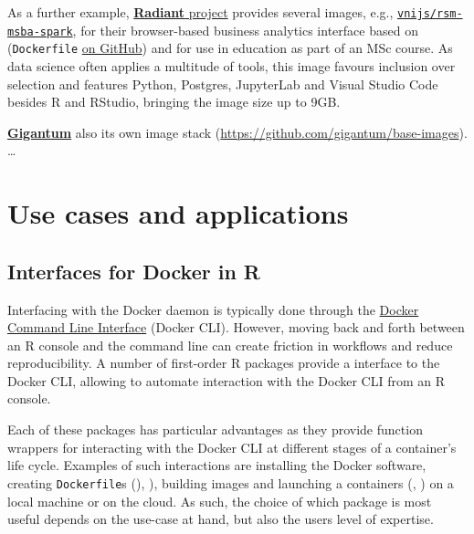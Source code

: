 As a further example,
\href{https://radiant-rstats.github.io/docs/}{\textbf{Radiant} project}
provides several images, e.g.,
\href{https://hub.docker.com/r/vnijs/rsm-msba-spark}{\texttt{vnijs/rsm-msba-spark}},
for their browser-based business analytics interface based on
 (\texttt{Dockerfile}
\href{https://github.com/radiant-rstats/docker}{on GitHub}) and for use
in education as part of an MSc course. As data science often applies a
multitude of tools, this image favours inclusion over selection and
features Python, Postgres, JupyterLab and Visual Studio Code besides R
and RStudio, bringing the image size up to 9GB.

\textbf{\href{http://gigantum.com/}{Gigantum}} also its own image stack
(\url{https://github.com/gigantum/base-images}). \ldots{}

\hypertarget{use-cases-and-applications}{%
\section{Use cases and applications}\label{use-cases-and-applications}}

\label{applications}

\hypertarget{interfaces-for-docker-in-r}{%
\subsection{Interfaces for Docker in
R}\label{interfaces-for-docker-in-r}}

\label{interfaces}

Interfacing with the Docker daemon is typically done through the
\href{https://docs.docker.com/engine/reference/commandline/cli/}{Docker
Command Line Interface} (Docker CLI). However, moving back and forth
between an R console and the command line can create friction in
workflows and reduce reproducibility. A number of first-order R packages
provide a interface to the Docker CLI, allowing to automate interaction
with the Docker CLI from an R console.

Each of these packages has particular advantages as they provide
function wrappers for interacting with the Docker CLI at different
stages of a container's life cycle. Examples of such interactions are
installing the Docker software, creating \texttt{Dockerfile}s
(), ), building images and launching a
containers (, ) on a local machine or on the
cloud. As such, the choice of which package is most useful depends on
the use-case at hand, but also the users level of expertise.

